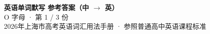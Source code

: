 \documentclass[10pt,a4paper]{article}
\begin{document}
\pagestyle{plain}

\begin{center}
{\LARGE\bfseries 英语单词默写 \quad 参考答案（中 $\to$ 英）}\\[0.22em]
{\large O 字母 · 第 1 / 3 份}\\[0.18em]
{\small 2026年上海市高考英语词汇用法手册 · 参照普通高中英语课程标准}
\end{center}

\vspace{0.2em}
\noindent{\color{rulegray}\rule{\textwidth}{0.8pt}}

\vspace{0.35em}

\vspace{0.25em}
\renewcommand{\arraystretch}{1.32}
\end{document}
